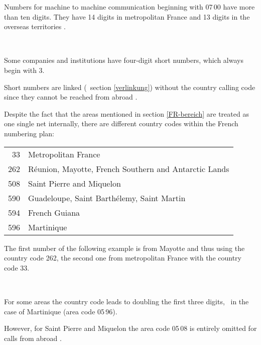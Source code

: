 \documentclass[numbers=noenddot]{scrreprt}
\newcommand*\vglAbschnitt[1]{(\cf\ section \ref{#1})}
\begin{document}
Numbers for machine to machine communication beginning with 07\,00 have more than ten digits. They have 14 digits in metropolitan France and 13 digits in the overseas territories \cite[18]{ARCEP}.
\begin{sidebyside}
   \\
\end{sidebyside}

Some companies and institutions have four-digit short numbers, which always begin with 3.
\begin{sidebyside}
\end{sidebyside}
Short numbers are linked
\vglAbschnitt{verlinkung} without the country calling code since they cannot be reached from abroad \cite[26]{ARCEP}.

Despite the fact that the areas mentioned in section \ref{FR-bereich} are treated as one single net internally, there are different country codes within the French numbering plan:
\begin{center}
\begin{tabular}{rl}
33 & Metropolitan France \\
262 & R\'eunion, Mayotte, French Southern and Antarctic Lands \\
508 & Saint Pierre and Miquelon \\
590 & Guadeloupe, Saint Barth\'elemy, Saint Martin \\
594 & French Guiana \\
596 & Martinique \\
\end{tabular}
\end{center}
The first number of the following example is from Mayotte and thus using the country code 262, the second one from metropolitan France with the country code 33.
\begin{sidebyside}
   \\
\end{sidebyside}

For some areas the country code leads to doubling the first three digits, \eg\ in the case of Martinique (area code 05\,96).
\begin{sidebyside}
\end{sidebyside}
However, for Saint Pierre and Miquelon the area code 05\,08 is entirely omitted for calls from abroad \cite[13]{ARCEP}.
\begin{sidebyside}
\end{sidebyside}
\end{document}
